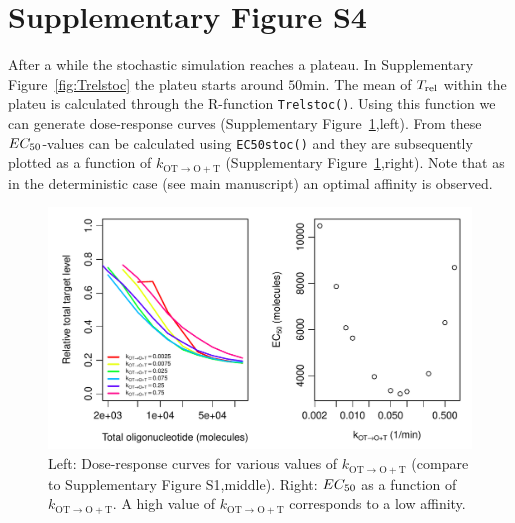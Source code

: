 \documentclass[a4paper,11pt]{article}
\newenvironment{Ncenter}{%
  \setlength\topsep{-10pt}
  \setlength\parskip{-10pt}
  \begin{center}
}{%
  \end{center}
}
\newcommand{\kmo}{k_{\mathrm{OT \to O+T}}}
\newcommand{\Trel}{T_{\rm{rel}}}
\newcommand{\EC}{EC_{\rm{50}}}
\begin{document}
\section{Supplementary Figure S4}
After a while the stochastic simulation reaches a plateau. In Supplementary Figure~\ref{fig:Trelstoc} the plateu starts around $50$min. The mean of $\Trel$ within the plateu is calculated through the R-function \texttt{Trelstoc()}. Using this function we can generate dose-response curves (Supplementary Figure~\ref{fig:stocEC50},left). From these $\EC$-values can be calculated using \texttt{EC50stoc()} and they are subsequently plotted as a function of $\kmo$ (Supplementary Figure~\ref{fig:stocEC50},right).
Note that as in the deterministic case (see main manuscript) an optimal affinity is observed.
\begin{Schunk}
\end{Schunk}
\begin{figure}[!h]
\begin{Ncenter}
\includegraphics[width=\textwidth]{SuppFile1-EC50.pdf}
\end{Ncenter}
\caption{Left: Dose-response curves for various values of $\kmo$ (compare to Supplementary Figure S1,middle). Right: $\EC$ as a function of $\kmo$. A high value of $\kmo$ corresponds to a low affinity.}\label{fig:stocEC50}
\end{figure}
\newpage
\end{document}
